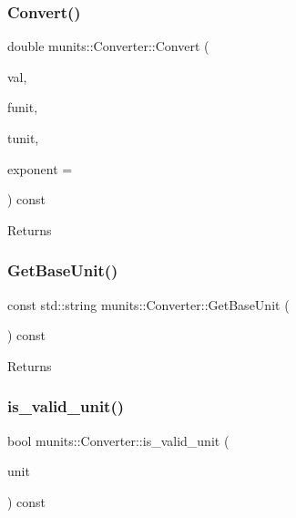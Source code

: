 \subsubsection{\texorpdfstring{Convert()}{Convert()}}
{\footnotesize\ttfamily double munits\+::\+Converter\+::\+Convert (\begin{DoxyParamCaption}\item[{double}]{val,  }\item[{\hyperlink{classmunits_1_1_unit_notation}{munits\+::\+Unit\+Notation}}]{funit,  }\item[{\hyperlink{classmunits_1_1_unit_notation}{munits\+::\+Unit\+Notation}}]{tunit,  }\item[{int}]{exponent = {} }\end{DoxyParamCaption}) const}

\begin{DoxyReturn}{Returns}

\end{DoxyReturn}
\mbox{\label{classmunits_1_1_converter_a3c707dedadbd4bf40f1836f463357d55}} 
\subsubsection{\texorpdfstring{Get\+Base\+Unit()}{GetBaseUnit()}}
{\footnotesize\ttfamily const std\+::string munits\+::\+Converter\+::\+Get\+Base\+Unit (\begin{DoxyParamCaption}{ }\end{DoxyParamCaption}) const\hspace{0.3cm}{\ttfamily [inline]}}

\begin{DoxyReturn}{Returns}

\end{DoxyReturn}
\mbox{\label{classmunits_1_1_converter_aa102ca105463948f68ba7a5b399bac42}} 
\subsubsection{\texorpdfstring{is\+\_\+valid\+\_\+unit()}{is\_valid\_unit()}}
{\footnotesize\ttfamily bool munits\+::\+Converter\+::is\+\_\+valid\+\_\+unit (\begin{DoxyParamCaption}\item[{const \hyperlink{classmunits_1_1_unit_notation}{munits\+::\+Unit\+Notation} \&}]{unit }\end{DoxyParamCaption}) const}

